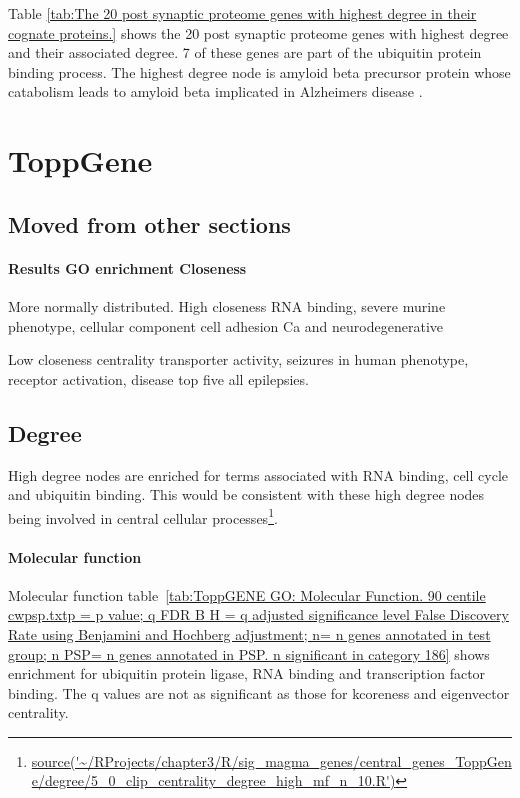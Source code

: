 Table \ref{tab:The 20 post synaptic proteome genes with highest degree in their cognate proteins.} shows the 20 post synaptic proteome genes with highest degree and their associated degree. 7 of these genes are part of the ubiquitin protein binding process.  The highest degree node is amyloid beta precursor protein whose catabolism leads to amyloid beta implicated in Alzheimers disease \cite{esch1990cleavage}. 


\clearpage

\section{ToppGene}
\subsection{Moved from other sections}
\paragraph{Results GO enrichment Closeness}
More normally distributed.
High closeness RNA binding, severe murine phenotype, cellular component cell adhesion
Ca and neurodegenerative

Low closeness centrality transporter activity, seizures in human phenotype, receptor activation, disease top five all epilepsies. 

\subsection{Degree}
High degree nodes are enriched for terms associated with RNA binding, cell cycle and ubiquitin binding. This would be consistent with these high degree nodes being involved in central cellular processes\footnote{\url{source('~/RProjects/chapter3/R/sig_magma_genes/central_genes_ToppGene/degree/5_0_clip_centrality_degree_high_mf_n_10.R')}}.

\paragraph{Molecular function}
Molecular function table~\ref{tab:ToppGENE GO: Molecular Function. 90 centile cwpsp.txtp = p value; q FDR B H = q adjusted significance level False Discovery Rate using Benjamini and Hochberg adjustment; n= n genes annotated in test group; n PSP= n genes annotated in PSP. n significant in category 186} shows enrichment for ubiquitin protein ligase, RNA binding and transcription factor binding. The q values are not as significant as those for kcoreness and eigenvector centrality.

